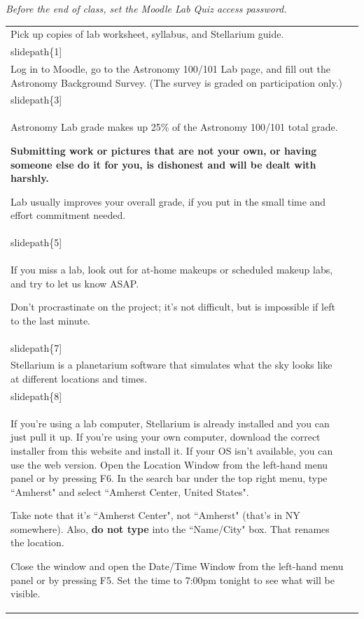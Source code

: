 \documentclass[12pt]{article}
\begin{document}
\newcommand\slidepath[1]{ppt/lab01/Slide#1.jpeg}

\emph{Before the end of class, set the Moodle Lab Quiz access password.}

\begin{longtable}{|m{}|m{}|}\hline
Pick up copies of lab worksheet, syllabus, and Stellarium guide. & \texttt{[image: \\slidepath\{1]}}\\\hline
Log in to Moodle, go to the Astronomy 100/101 Lab page, and fill out the Astronomy Background Survey. (The survey is graded on participation only.) & \texttt{[image: \\slidepath\{3]}}\\\hline
Astronomy Lab grade makes up 25\% of the Astronomy 100/101 total grade.

\textbf{Submitting work or pictures that are not your own, or having someone else do it for you, is dishonest and will be dealt with harshly.}

Lab usually improves your overall grade, if you put in the small time and effort commitment needed. & \texttt{[image: \\slidepath\{5]}}\\\hline
If you miss a lab, look out for at-home makeups or scheduled makeup labs, and try to let us know ASAP.

Don't procrastinate on the project; it's not difficult, but is impossible if left to the last minute. & \texttt{[image: \\slidepath\{7]}}\\\hline
Stellarium is a planetarium software that simulates what the sky looks like at different locations and times. & \texttt{[image: \\slidepath\{8]}}\\\hline
If you're using a lab computer, Stellarium is already installed and you can just pull it up. If you're using your own computer, download the correct installer from this website and install it. If your OS isn't available, you can use the web version. Open the Location Window from the left-hand menu panel or by pressing F6. In the search bar under the top right menu, type ``Amherst" and select ``Amherst Center, United States".

Take note that it's ``Amherst Center", not ``Amherst" (that's in NY somewhere). Also, \textbf{do not type} into the ``Name/City" box. That renames the location.

Close the window and open the Date/Time Window from the left-hand menu panel or by pressing F5. Set the time to 7:00pm tonight to see what will be visible.


\end{longtable}
\end{document}
